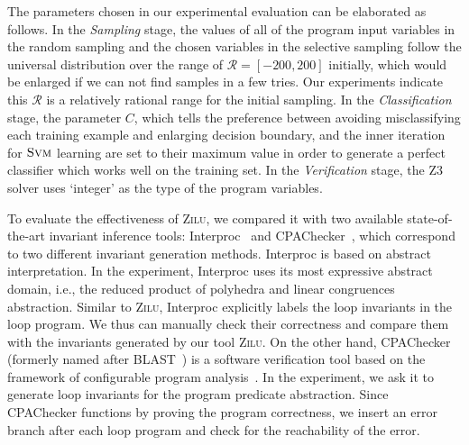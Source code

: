 The parameters chosen in our experimental evaluation can be elaborated as follows. 
In the \emph{Sampling} stage, 
the values of all of the program input variables in the random sampling 
and the chosen variables in the selective sampling 
follow the universal distribution over the range of $\mathcal{R} = [-200, 200]$ initially,
which would be enlarged if we can not find samples in a few tries.
Our experiments indicate this $\mathcal{R}$ is a relatively rational range for the initial sampling.
In the \emph{Classification} stage, 
the parameter $C$, 
which tells the preference between avoiding misclassifying each training example and enlarging decision boundary,
and the inner iteration 
for $\textsc{Svm}$ learning are set to their maximum value 
in order to generate a perfect classifier which works well on the training set. 
In the \emph{Verification} stage, 
the Z3 solver uses `integer' as the type of the program variables. 

To evaluate the effectiveness of \textsc{Zilu}, 
we compared it with two available state-of-the-art invariant inference tools: 
Interproc~\cite{cite} and CPAChecker~\cite{beyer2011cpachecker}, 
which correspond to two different invariant generation methods. 
Interproc is based on abstract interpretation. 
In the experiment, Interproc uses its most expressive abstract domain, i.e., 
the reduced product of polyhedra and linear congruences abstraction. 
Similar to \textsc{Zilu}, Interproc explicitly labels the loop invariants in the loop program. 
We thus can manually check their correctness
and compare them with the invariants generated by our tool \textsc{Zilu}. 
On the other hand, CPAChecker (formerly named after BLAST~\cite{henzinger2003software}) is a software verification tool 
based on the framework of configurable program analysis~\cite{beyer2007configurable}. 
In the experiment, we ask it to generate loop invariants for the program predicate abstraction. 
Since CPAChecker functions by proving the program correctness, 
we insert an error branch after each loop program and check for the reachability of the error. 

